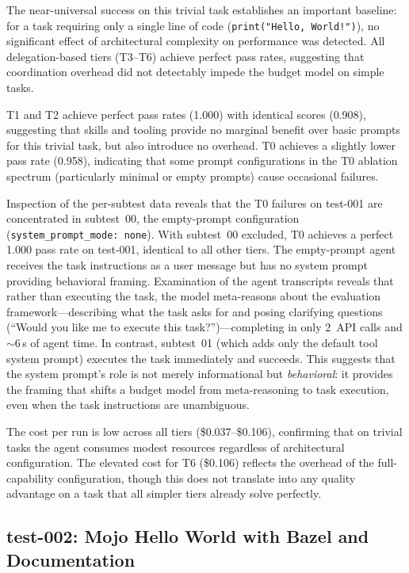 \documentclass[11pt]{article}
\begin{document}
The near-universal success on this trivial task establishes an important
baseline: for a task requiring only a single line of code
(\texttt{print("Hello, World!")}), no significant effect of architectural
complexity on performance was detected. All delegation-based tiers (T3--T6)
achieve perfect pass rates, suggesting that coordination overhead did not
detectably impede the budget model on simple tasks.

T1 and T2 achieve perfect pass rates (1.000) with identical scores (0.908),
suggesting that skills and tooling provide no marginal benefit over basic
prompts for this trivial task, but also introduce no overhead. T0 achieves a
slightly lower pass rate (0.958), indicating that some prompt configurations
in the T0 ablation spectrum (particularly minimal or empty prompts) cause
occasional failures.

Inspection of the per-subtest data reveals that the T0 failures on test-001
are concentrated in subtest~00, the empty-prompt configuration
(\texttt{system\_prompt\_mode: none}). With subtest~00 excluded, T0 achieves a
perfect 1.000 pass rate on test-001, identical to all other tiers. The
empty-prompt agent receives the task instructions as a user message but has no
system prompt providing behavioral framing. Examination of the agent
transcripts reveals that rather than executing the task, the model
meta-reasons about the evaluation framework---describing what the task asks
for and posing clarifying questions (``Would you like me to execute this
task?'')---completing in only 2~API calls and $\sim$6\,s of agent time. In
contrast, subtest~01 (which adds only the default tool system prompt) executes
the task immediately and succeeds. This suggests that the system prompt's role
is not merely informational but \emph{behavioral}: it provides the framing
that shifts a budget model from meta-reasoning to task execution, even when
the task instructions are unambiguous.

The cost per run is low across all tiers (\$0.037--\$0.106), confirming that
on trivial tasks the agent consumes modest resources regardless of
architectural configuration. The elevated cost for T6 (\$0.106) reflects the
overhead of the full-capability configuration, though this does not translate
into any quality advantage on a task that all simpler tiers already solve
perfectly.

\subsection{test-002: Mojo Hello World with Bazel and Documentation}
\label{sec:test002}
\end{document}
